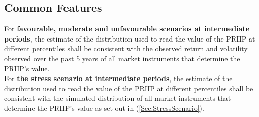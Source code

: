 \subsection{Common Features}
For \textbf{\color{blue}favourable, moderate and unfavourable scenarios at intermediate periods}, the estimate of the distribution used to read the value of the PRIIP at different percentiles shall be consistent with the observed return and volatility observed over the past 5 years of all market instruments that determine the PRIIP's value.\\
For \textbf{\color{blue}the stress scenario at intermediate periods}, the estimate of the distribution used to read the value of the PRIIP at different percentiles shall be consistent with the simulated distribution of all market instruments that determine the PRIIP's value as set out in (\ref{Sec:StressScenario}).


 


